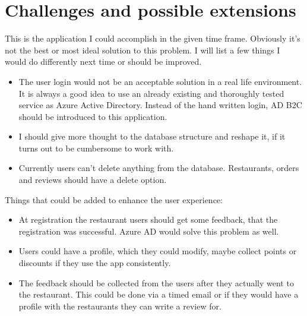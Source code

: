 \chapter{Challenges and possible extensions}\label{Ch5}

This is the application I could accomplish in the given time frame. Obviously it's not the best or most ideal solution to this problem. I will list a few things I would do differently next time or should be improved.

\begin{itemize}
	\item The user login would not be an acceptable solution in a real life environment. It is always a good idea to use an already existing and thoroughly tested service as Azure Active Directory. Instead of the hand written login, AD B2C should be introduced to this application.
	
	\item I should give more thought to the database structure and reshape it, if it turns out to be cumbersome to work with.
	
	\item Currently users can't delete anything from the database. Restaurants, orders and reviews should have a delete option.
\end{itemize}

Things that could be added to enhance the user experience:

\begin{itemize}
	\item At registration the restaurant users should get some feedback, that the registration was successful. Azure AD would solve this problem as well.
	
	\item Users could have a profile, which they could modify, maybe collect points or discounts if they use the app consistently.
	
	\item The feedback should be collected from the users after they actually went to the restaurant. This could be done via a timed email or if they would have a profile with the restaurants they can write a review for.
\end{itemize}
